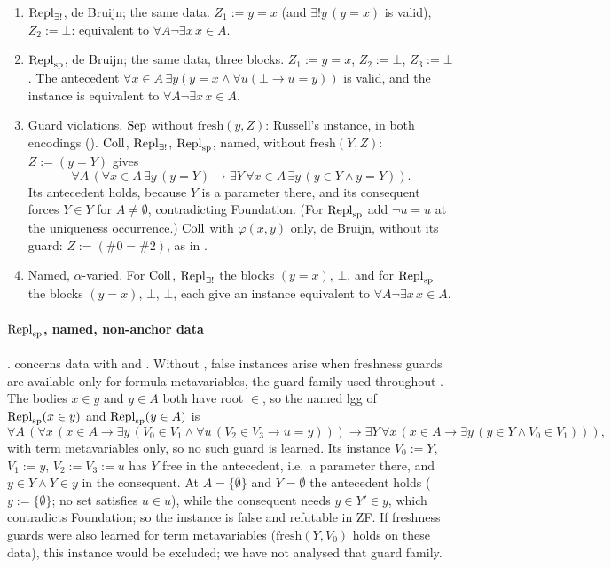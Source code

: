 \begin{enumerate}[label=(\arabic*)]
\item $\mathrm{Repl}_{\exists!}$, de Bruijn; the same data. $Z_1:=y=x$ (and $\exists!y\,(y=x)$ is valid), $Z_2:=\bot$: equivalent to
  $\forall A\neg\exists x\,x\in A$.
\item $\mathrm{Repl}_{\mathrm{sp}}$, de Bruijn; the same data, three blocks. $Z_1:=y=x$, $Z_2:=\bot$, $Z_3:=\bot$. The antecedent
  $\forall x{\in}A\,\exists y(y=x\wedge\forall u(\bot\to u=y))$ is valid, and the instance is equivalent to $\forall
  A\neg\exists x\,x\in A$.
\item Guard violations. $\mathrm{Sep}$ without $\mathrm{fresh}(y,Z)$: Russell's instance, in both encodings
  (). $\mathrm{Coll}$, $\mathrm{Repl}_{\exists!}$, $\mathrm{Repl}_{\mathrm{sp}}$, named, without $\mathrm{fresh}(Y,Z)$: $Z:=(y=Y)$ gives
  \[\forall A\,(\forall x{\in}A\,\exists y\,(y=Y)\to\exists Y\,\forall x{\in}A\,\exists y\,(y\in Y\wedge y=Y)).\]
  Its antecedent
  holds, because $Y$ is a parameter there, and its consequent forces $Y\in Y$ for $A\ne\emptyset$, contradicting
  Foundation. (For $\mathrm{Repl}_{\mathrm{sp}}$ add $\neg u=u$ at the uniqueness occurrence.) $\mathrm{Coll}$ with $\varphi(x,y)$ only, de Bruijn,
  without its guard: $Z:=(\#0=\#2)$, as in .
\item Named, $\alpha$-varied. For $\mathrm{Coll}$, $\mathrm{Repl}_{\exists!}$ the blocks $(y=x)$, $\bot$, and for $\mathrm{Repl}_{\mathrm{sp}}$ the blocks $(y=x)$,
  $\bot$, $\bot$, each give an instance equivalent to $\forall A\neg\exists x\,x\in A$.
\end{enumerate}

\paragraph{$\mathrm{Repl}_{\mathrm{sp}}$, named, non-anchor data} .  concerns data with
\evR{} and . Without \evR, false instances arise when freshness guards are available only for formula
metavariables, the guard family used throughout . The bodies $x\in y$ and $y\in A$ both
have root $\in$, so the named lgg of $\mathrm{Repl}_{\mathrm{sp}}(x\in y)$ and $\mathrm{Repl}_{\mathrm{sp}}(y\in A)$ is
\[\forall A\,(\forall x\,(x\in A\to\exists y\,(V_0\in V_1\wedge\forall u\,(V_2\in V_3\to u=y)))\to\exists Y\,\forall
x\,(x\in A\to\exists y\,(y\in Y\wedge V_0\in V_1))),\]
with term metavariables only, so no such guard is learned. Its instance $V_0:=Y$, $V_1:=y$, $V_2:=V_3:=u$ has $Y$ free
in the antecedent, i.e.\ a parameter there, and $y\in Y\wedge Y\in y$ in the consequent. At $A=\{\emptyset\}$ and
$Y=\emptyset$ the antecedent holds ($y:=\{\emptyset\}$; no set satisfies $u\in u$), while the consequent needs $y\in
Y'\in y$, which contradicts Foundation; so the instance is false and refutable in ZF. If freshness guards were also
learned for term metavariables ($\mathrm{fresh}(Y,V_0)$ holds on these data), this instance would be excluded; we have
not analysed that guard family.

